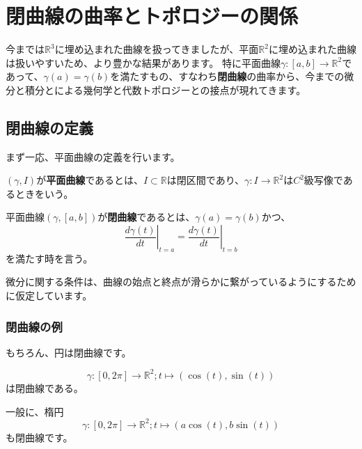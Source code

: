 \chapter{閉曲線の曲率とトポロジーの関係}

今までは$\mathbb{R}^3$に埋め込まれた曲線を扱ってきましたが、平面$\mathbb{R}^2$に埋め込まれた曲線は扱いやすいため、より豊かな結果があります。
特に平面曲線$\gamma:[a,b]\to\mathbb{R}^2$であって、$\gamma(a)=\gamma(b)$を満たすもの、すなわち\textbf{閉曲線}の曲率から、今までの微分と積分とによる幾何学と代数トポロジーとの接点が現れてきます。

\section{閉曲線の定義}

まず一応、平面曲線の定義を行います。
\begin{definition}[平面曲線]
  $(\gamma,I)$が\textbf{平面曲線}であるとは、$I\subset\mathbb{R}$は閉区間であり、$\gamma:I\to\mathbb{R}^2$は$C^2$級写像であるときをいう。
\end{definition}

\begin{definition}[閉曲線]
  平面曲線$(\gamma,[a,b])$が\textbf{閉曲線}であるとは、$\gamma(a)=\gamma(b)$かつ、
  \[
    \left.\frac{d\gamma(t)}{dt}\right|_{t=a}=\left.\frac{d\gamma(t)}{dt}\right|_{t=b}
  \]
  を満たす時を言う。
\end{definition}
微分に関する条件は、曲線の始点と終点が滑らかに繋がっているようにするために仮定しています。

\subsection{閉曲線の例}

もちろん、円は閉曲線です。
\begin{example}
  \[
    \gamma:[0,2\pi]\to\mathbb{R}^2;t\mapsto(\cos(t),\sin(t))
  \]
  は閉曲線である。
\end{example}

一般に、楕円
\[
  \gamma:[0,2\pi]\to\mathbb{R}^2;t\mapsto(a\cos(t),b\sin(t))
\]
も閉曲線です。

